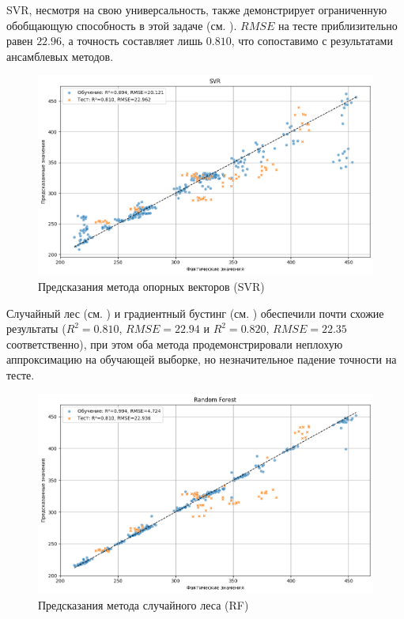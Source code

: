 SVR, несмотря на свою универсальность, также демонстрирует ограниченную обобщающую способность в этой задаче (см. ). $RMSE$ на тесте приблизительно равен $22.96$, а точность составляет лишь $0.810$, что сопоставимо с результатами ансамблевых методов.

\begin{figure}[htbp!]
	\centering
	\includegraphics[width=.9\linewidth]{my_folder/images/droplet_size/SVR.png}
	\caption{Предсказания метода опорных векторов (SVR)} 
	\label{fig:droplet-size-svr}  
\end{figure}

Случайный лес (см. ) и градиентный бустинг (см. ) обеспечили почти схожие результаты ($R^2 = 0.810$, $RMSE = 22.94$ и $R^2 = 0.820$, $RMSE = 22.35$ соответственно), при этом оба метода продемонстрировали неплохую аппроксимацию на обучающей выборке, но незначительное падение точности на тесте.

\begin{figure}[htbp!]
	\centering
	\includegraphics[width=.9\linewidth]{my_folder/images/droplet_size/Random-Forest.png}
	\caption{Предсказания метода случайного леса (RF)} 
	\label{fig:droplet-size-rf}  
\end{figure}


